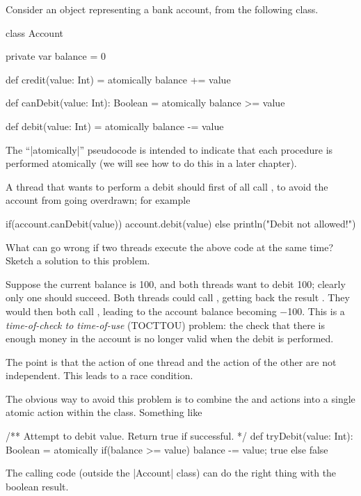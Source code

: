 \begin{questionS}
\label{exercise:account}
Consider an object representing a bank account, from the following class.
%
\begin{scala}
class Account{
  private var balance = 0

  def credit(value: Int) = atomically{ balance += value }

  def canDebit(value: Int): Boolean = atomically{ balance >= value }

  def debit(value: Int) = atomically{ balance -= value }
}
\end{scala}
%
The ``|atomically|'' pseudocode is intended to indicate that each
procedure is performed atomically (we will see how to do this in a
later chapter).

A thread that wants to perform a debit should first of all call
, to avoid the account from going overdrawn; for example
%
\begin{scala}[showstringspaces=false]
  if(account.canDebit(value)) account.debit(value)
  else println("Debit not allowed!")
\end{scala}

What can go wrong if two threads execute the above code at the same
time?  Sketch a solution to this problem.
\end{questionS}


\begin{answerS}
Suppose the current balance is 100, and both threads want to debit 100;
clearly only one should succeed.  Both threads could call
, getting back the result .  They would then
both call , leading to the account balance becoming $-$100.
This is a \emph{time-of-check to time-of-use} (TOCTTOU) problem: the check
that there is enough money in the account is no longer valid when the debit is
performed.

The point is that the  action of one thread and the
 action of the other are not independent.  This leads to a race
condition.

The obvious way to avoid this problem is to combine the  and
 actions into a single atomic action within the 
class.  Something like
%
\begin{scala}
  /** Attempt to debit value.  Return true if successful. */
  def tryDebit(value: Int): Boolean = atomically{
    if(balance >= value){ balance -= value; true } else false
  }
\end{scala}
% 
The calling code (outside the |Account| class) can do the right thing with the
boolean result. 
\end{answerS}

